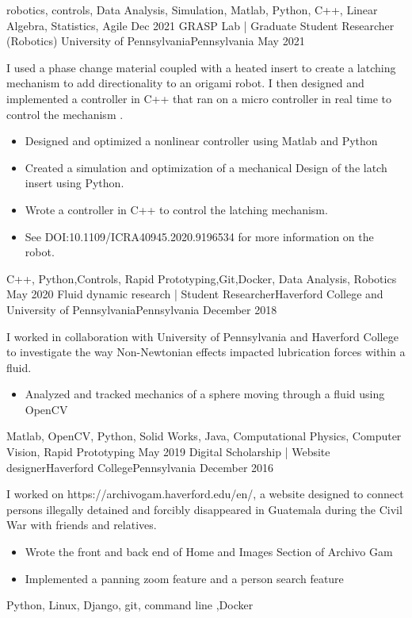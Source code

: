 \begin{experiences}
{\begin{itemize}
 			\end{itemize} 
                 }
                {robotics, controls, Data Analysis, Simulation, Matlab, Python, C++, Linear Algebra, Statistics, Agile}   
 \experience
    {Dec 2021}     {GRASP Lab | Graduate Student Researcher (Robotics)  }{ University of Pennsylvania}{Pennsylvania}
    {May 2021}    {
 I used a phase change material coupled with a heated insert to create a latching mechanism to add directionality to an origami robot. I then designed and implemented a controller in C++ that ran on a micro controller in real time to control the mechanism .
                      \begin{itemize}
			\item Designed and optimized a nonlinear controller using Matlab and Python 
			\item Created a simulation and optimization of a mechanical Design  of the latch insert using Python.
			\item Wrote a controller in C++ to control the latching mechanism.
			\item  See DOI:10.1109/ICRA40945.2020.9196534 for more information on the robot.
                      \end{itemize}
                    }
                    {C++, Python,Controls, Rapid Prototyping,Git,Docker, Data Analysis, Robotics}
  \experience
    {May 2020}   {Fluid dynamic research | Student Researcher}{Haverford College and University of Pennsylvania}{Pennsylvania}
    {December 2018} {
  I worked in collaboration with University of Pennsylvania and Haverford College to investigate the way Non-Newtonian effects impacted lubrication forces within a fluid.
                      \begin{itemize}
                        \item Analyzed and tracked mechanics of a sphere moving through a fluid using OpenCV 
                      \end{itemize}
                    }
                    {Matlab, OpenCV, Python, Solid Works, Java, Computational Physics, Computer Vision, Rapid Prototyping}
  \experience
    {May 2019}   {Digital Scholarship | Website designer}{Haverford College}{Pennsylvania}
    {December 2016} {
    I worked on https://archivogam.haverford.edu/en/, a website designed to connect persons illegally detained and forcibly disappeared in Guatemala during the Civil War with friends and relatives.
                      \begin{itemize}
                       \item Wrote the front and back end of Home and Images Section of Archivo Gam 
		     \item Implemented a panning zoom feature and a person search feature
                      \end{itemize}
                    }
                    {Python, Linux, Django, git, command line ,Docker}

 
 

\end{experiences}
